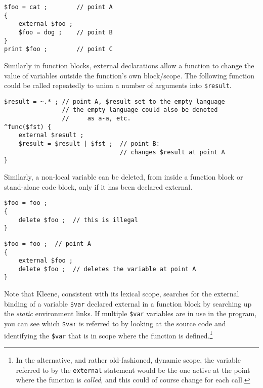 \begin{samepage}
\begin{Verbatim}
$foo = cat ;        // point A
{
    external $foo ; 
    $foo = dog ;    // point B
}
print $foo ;        // point C
\end{Verbatim}
\end{samepage}

\noindent
Similarly in function blocks, external declarations allow a function to change the value
of variables outside the function's own block/scope.  The following function could be
called repeatedly to union a number of arguments into \verb!$result!.

\begin{samepage}
\begin{Verbatim}
$result = ~.* ; // point A, $result set to the empty language
                // the empty language could also be denoted 
                //     as a-a, etc.
^func($fst) {
    external $result ;
    $result = $result | $fst ;  // point B: 
                                // changes $result at point A
}
\end{Verbatim}
\end{samepage}

\noindent
Similarly, a non-local variable can be deleted, from inside a
function block or stand-alone code block, only if it has been
declared external.

\begin{samepage}
\begin{Verbatim}
$foo = foo ;
{
    delete $foo ;  // this is illegal
}
\end{Verbatim}
\end{samepage}

\begin{samepage}
\begin{Verbatim}
$foo = foo ;  // point A
{
    external $foo ;
    delete $foo ;  // deletes the variable at point A
}
\end{Verbatim}
\end{samepage}

Note that Kleene, consistent with its lexical scope, searches for
the external binding of a variable \verb!$var! declared external in
a function block by
searching up the \emph{static} environment links.  If multiple
\verb!$var! variables are in use in the program, you can see
which \verb!$var! is referred to by
looking at the source code and identifying the \verb!$var! that
is in scope where the function is defined.\footnote{In the
alternative, and rather old-fashioned, dynamic scope, the variable
referred to by the \texttt{external} statement would be the one
active at the point where the function is \emph{called}, and this
could of course change for each call.}

